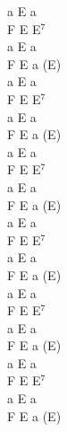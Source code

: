 \documentclass[a5paper, 10pt]{book}
\begin{document}
\begin{minipage}[t]{0.2\textwidth}
a E a\\
F E E$^7$\\
a E a\\
F E a (E)\\

a E a\\
F E E$^7$\\
a E a\\
F E a (E)\\

a E a\\
F E E$^7$\\
a E a\\
F E a (E)\\

a E a\\
F E E$^7$\\
a E a\\
F E a (E)\\

a E a\\
F E E$^7$\\
a E a\\
F E a (E)\\

a E a\\
F E E$^7$\\
a E a\\
F E a (E)\\

\end{minipage}

\newpage
\end{document}
